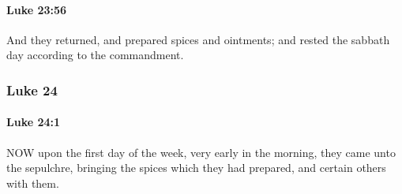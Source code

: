		\paragraph{Luke 23:56} %
			\label{LUKE-23-56}

			And they returned, and prepared spices and ointments; and rested the sabbath day according to the commandment.

			\begin{framed}
			\scriptsize
				\begin{compactdesc}
					\item[SBLG] 
				\end{compactdesc}
			\end{framed}

	\subsubsection{Luke 24} %
		\label{LUKE-24}
		
		\paragraph{Luke 24:1} %
			\label{LUKE-24-1}

			NOW upon the first day of the week, very early in the morning, they came unto the sepulchre, bringing the spices which they had prepared, and certain others with them.

